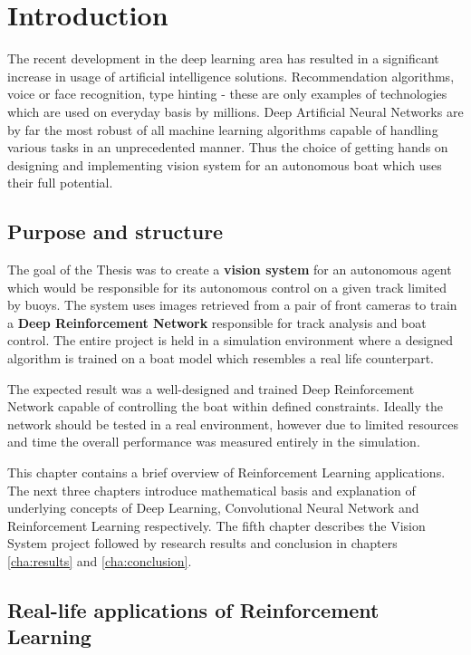 \chapter{Introduction}
\label{cha:introduction}

The recent development in the deep learning area has resulted in a significant increase in usage of artificial intelligence
solutions. Recommendation algorithms, voice or face recognition, type hinting - these are only examples of technologies which are
used on everyday basis by millions. Deep Artificial Neural Networks are by far the most robust of all machine learning
algorithms capable of handling various tasks in an unprecedented manner. Thus the choice of getting hands on designing and
implementing vision system for an autonomous boat which uses their full potential.

\section{Purpose and structure}
\label{sec:purpose}

The goal of the Thesis was to create a \textbf{vision system} for an autonomous agent which would be responsible for its autonomous control
on a given track limited by buoys. The system uses images retrieved from a pair of front cameras to train a \textbf{Deep Reinforcement
Network} responsible for track analysis and boat control. The entire project is held in a simulation environment where a designed algorithm
is trained on a boat model which resembles a real life counterpart. 

The expected result was a well-designed and trained Deep Reinforcement Network capable of controlling the boat within defined constraints.
Ideally the network should be tested in a real environment, however due to limited resources and time the overall performance was measured
entirely in the simulation.

This chapter contains a brief overview of Reinforcement Learning applications. The next three chapters introduce mathematical basis and
explanation of underlying concepts of Deep Learning, Convolutional Neural Network and Reinforcement Learning respectively. The fifth
chapter describes the Vision System project followed by research results and conclusion in chapters \ref{cha:results} and \ref{cha:conclusion}.

\newpage

\section{Real-life applications of Reinforcement Learning}
\label{sec:real-life-applications-of-deep-learning}

